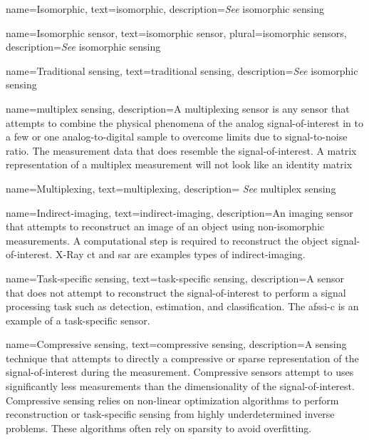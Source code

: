 {
name={Isomorphic},
text={isomorphic},
description={\emph{See} \gls{isomorphic sensing}}
}

{
name={Isomorphic sensor},
text={isomorphic sensor},
plural={isomorphic sensors},
description={\emph{See} \gls{isomorphic sensing}}
}

{
name={Traditional sensing},
text={traditional sensing},
description={\emph{See} \gls{isomorphic sensing}}
}

{
name={multiplex sensing},
description={A multiplexing sensor is any sensor that attempts to combine the physical phenomena of the analog signal-of-interest in to a few or one analog-to-digital sample to overcome limits due to signal-to-noise ratio. The measurement data that does resemble the signal-of-interest. A matrix representation of a multiplex measurement will not look like an identity matrix}
}

{
name={Multiplexing},
text={multiplexing},
description={ \emph{See} \gls{multiplex sensing}}
}

{
name={Indirect-imaging},
text={indirect-imaging},
description={An imaging sensor that attempts to reconstruct an image of an object using non-isomorphic measurements. A computational step is required to reconstruct the object signal-of-interest. X-Ray \gls{ct} and \gls{sar} are examples types of indirect-imaging.  }
}

{
name={Task-specific sensing},
text={task-specific sensing},
description={A sensor that does not attempt to reconstruct the signal-of-interest to perform a signal processing task such as detection, estimation, and classification. The \gls{afssi-c} is an example of a task-specific sensor. }
}

{
name={Compressive sensing},
text={compressive sensing},
description={A sensing technique that attempts to directly a compressive or sparse representation of the signal-of-interest during the measurement. Compressive sensors attempt to uses significantly less measurements than the dimensionality of the signal-of-interest. Compressive sensing relies on non-linear optimization algorithms to perform reconstruction or task-specific sensing from highly underdetermined inverse problems. These algorithms often rely on sparsity to avoid overfitting.}
}

